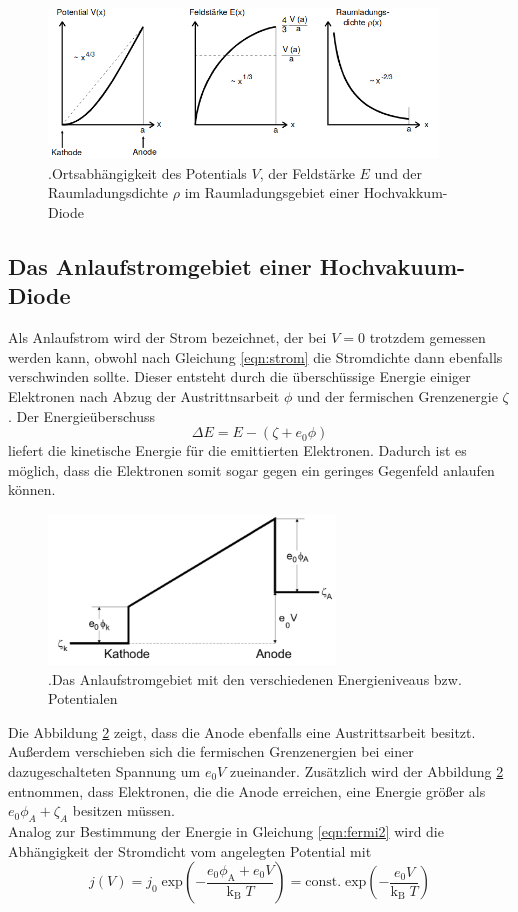 \begin{figure}[h]
    \centering
    \includegraphics[height=4cm]{Theorie/Gebiet.png}
    \caption{.Ortsabhängigkeit des Potentials $V$, der Feldstärke $E$ und der Raumladungsdichte $\rho$ im Raumladungsgebiet einer Hochvakkum-Diode}
    \label{fig:gebiet}
\end{figure}

\subsection{Das Anlaufstromgebiet einer Hochvakuum-Diode}
Als Anlaufstrom wird der Strom bezeichnet, der bei $V = 0$ trotzdem gemessen werden kann, obwohl nach Gleichung \ref{eqn:strom} die Stromdichte dann ebenfalls verschwinden sollte.
Dieser entsteht durch die überschüssige Energie einiger Elektronen nach Abzug der Austrittnsarbeit $\phi$ und der fermischen Grenzenergie $\zeta$.
Der Energieüberschuss
\begin{equation}
    \label{eqn:energie}
    \Delta E = E - (\zeta + e_0 \phi)
\end{equation}
liefert die kinetische Energie für die emittierten Elektronen.
Dadurch ist es möglich, dass die Elektronen somit sogar gegen ein geringes Gegenfeld anlaufen können.
\begin{figure}[h]
    \centering
    \includegraphics[height=4cm]{Theorie/Anlauf.png}
    \caption{.Das Anlaufstromgebiet mit den verschiedenen Energieniveaus bzw. Potentialen}
    \label{fig:anlauf}
\end{figure}
Die Abbildung \ref{fig:anlauf} zeigt, dass die Anode ebenfalls eine Austrittsarbeit besitzt.
Außerdem verschieben sich die fermischen Grenzenergien bei einer dazugeschalteten Spannung um $e_0 V$ zueinander.
Zusätzlich wird der Abbildung \ref{fig:anlauf} entnommen, dass Elektronen, die die Anode erreichen, eine Energie größer als $e_0 \phi_A + \zeta_A$ besitzen müssen. \\
Analog zur Bestimmung der Energie in Gleichung \ref{eqn:fermi2} wird die Abhängigkeit der Stromdicht vom angelegten Potential mit
\begin{equation}
    j(V) = j_0 \; \text{exp} \left (-\frac{e_0 \phi_\text{A} + e_0 V}{\text{k}_\text{B} \; T} \right) = \text{const.} \; \text{exp} \left ( - \frac{e_0 V}{\text{k}_\text{B} \; T}\right)
\end{equation}

